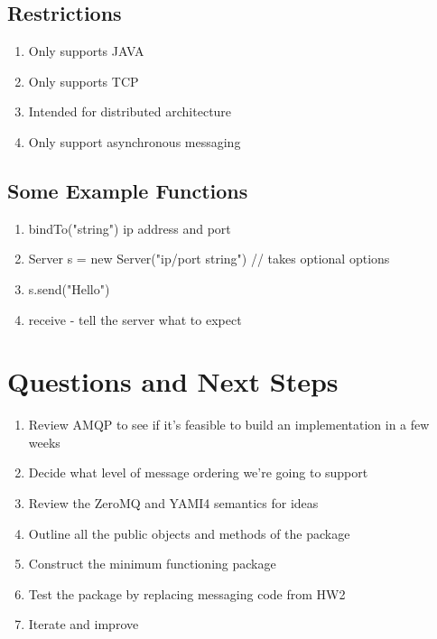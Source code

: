 \documentclass[twoside]{article}
\begin{document}
\subsection{Restrictions}

\begin{enumerate}
\item Only supports JAVA
\item Only supports TCP
\item Intended for distributed architecture
\item Only support asynchronous messaging
\end{enumerate}

\subsection{Some Example Functions}

\begin{enumerate}
\item bindTo("string") ip address and port
\item Server s = new Server("ip/port string") // takes optional options
\item s.send("Hello")
\item receive - tell the server what to expect
\end{enumerate}

\section{Questions and Next Steps}


\begin{enumerate}
\item Review AMQP to see if it's feasible to build an implementation in a few weeks
\item Decide what level of message ordering we're going to support
\item Review the ZeroMQ and YAMI4 semantics for ideas
\item Outline all the public objects and methods of the package
\item Construct the minimum functioning package 
\item Test the package by replacing messaging code from HW2
\item Iterate and improve
\end{enumerate}
\end{document}
